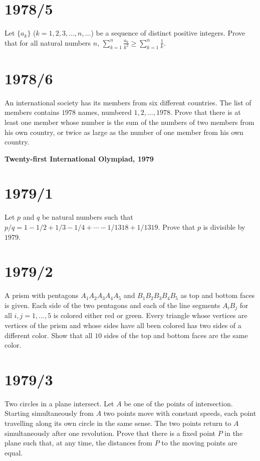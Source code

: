\documentclass[12pt]{article}
\begin{document}
\section*{1978/5}
Let $\{ a_k \}$ ($k = 1, 2, 3, \dots, n, \dots$) be a sequence of distinct positive integers.  
Prove that for all natural numbers $n$,
$
\sum_{k=1}^n \frac{a_k}{k^2} \ge \sum_{k=1}^n \frac{1}{k}.
$

\section*{1978/6}
An international society has its members from six different countries.  
The list of members contains $1978$ names, numbered $1, 2, \dots, 1978$.  
Prove that there is at least one member whose number is the sum of the numbers of two members from his own country,  
or twice as large as the number of one member from his own country.
 
\newpage\textbf{\large Twenty-first International Olympiad, 1979}

\titleformat{\section}{\normalfont\large\bfseries}{}{0.5em}{}
 
\section*{1979/1}
Let $p$ and $q$ be natural numbers such that
$p/q = 1 - 1/2 + 1/3 - 1/4 + \cdots - 1/1318 + 1/1319$.
Prove that $p$ is divisible by $1979$.
\section*{1979/2}
A prism with pentagons $A_1A_2A_3A_4A_5$ and $B_1B_2B_3B_4B_5$ as top and bottom faces is given.  
Each side of the two pentagons and each of the line segments $A_iB_j$ for all $i,j=1,\dots,5$ is colored either red or green.  
Every triangle whose vertices are vertices of the prism and whose sides have all been colored has two sides of a different color.  
Show that all $10$ sides of the top and bottom faces are the same color.
\section*{1979/3}
Two circles in a plane intersect. Let $A$ be one of the points of intersection.  
Starting simultaneously from $A$ two points move with constant speeds, each point travelling along its own circle in the same sense.  
The two points return to $A$ simultaneously after one revolution.  
Prove that there is a fixed point $P$ in the plane such that, at any time, the distances from $P$ to the moving points are equal.
\end{document}
